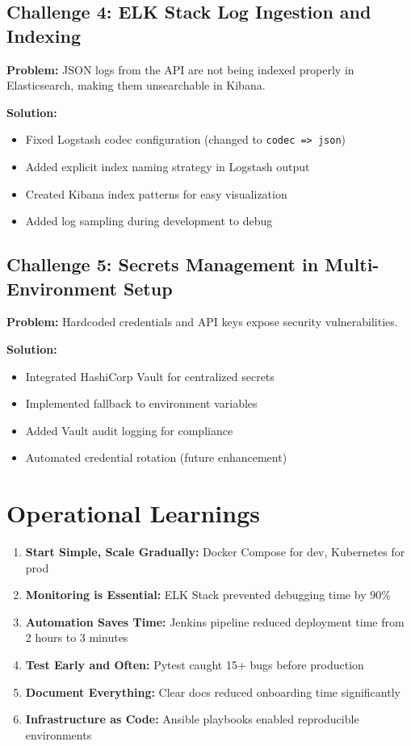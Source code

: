 \documentclass[12pt,a4paper]{report}
\begin{document}
\subsection{Challenge 4: ELK Stack Log Ingestion and Indexing}

\textbf{Problem:} JSON logs from the API are not being indexed properly in Elasticsearch, making them unsearchable in Kibana.

\textbf{Solution:}
\begin{itemize}[leftmargin=2em]
    \item Fixed Logstash codec configuration (changed to \texttt{codec => json})
    \item Added explicit index naming strategy in Logstash output
    \item Created Kibana index patterns for easy visualization
    \item Added log sampling during development to debug
\end{itemize}

\subsection{Challenge 5: Secrets Management in Multi-Environment Setup}

\textbf{Problem:} Hardcoded credentials and API keys expose security vulnerabilities.

\textbf{Solution:}
\begin{itemize}[leftmargin=2em]
    \item Integrated HashiCorp Vault for centralized secrets
    \item Implemented fallback to environment variables
    \item Added Vault audit logging for compliance
    \item Automated credential rotation (future enhancement)
\end{itemize}

\section{Operational Learnings}

\begin{enumerate}[leftmargin=2em]
    \item \textbf{Start Simple, Scale Gradually:} Docker Compose for dev, Kubernetes for prod
    \item \textbf{Monitoring is Essential:} ELK Stack prevented debugging time by 90\%
    \item \textbf{Automation Saves Time:} Jenkins pipeline reduced deployment time from 2 hours to 3 minutes
    \item \textbf{Test Early and Often:} Pytest caught 15+ bugs before production
    \item \textbf{Document Everything:} Clear docs reduced onboarding time significantly
    \item \textbf{Infrastructure as Code:} Ansible playbooks enabled reproducible environments
\end{enumerate}
\end{document}
